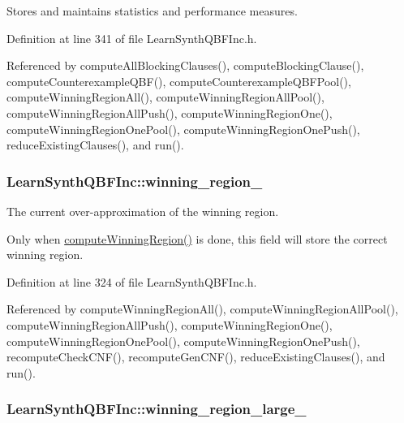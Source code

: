 Stores and maintains statistics and performance measures. 



Definition at line 341 of file Learn\-Synth\-Q\-B\-F\-Inc.\-h.



Referenced by compute\-All\-Blocking\-Clauses(), compute\-Blocking\-Clause(), compute\-Counterexample\-Q\-B\-F(), compute\-Counterexample\-Q\-B\-F\-Pool(), compute\-Winning\-Region\-All(), compute\-Winning\-Region\-All\-Pool(), compute\-Winning\-Region\-All\-Push(), compute\-Winning\-Region\-One(), compute\-Winning\-Region\-One\-Pool(), compute\-Winning\-Region\-One\-Push(), reduce\-Existing\-Clauses(), and run().

\hypertarget{classLearnSynthQBFInc_abc3503bdb6be7053a7c3d3d7e57858d6}{
\subsubsection[{winning\-\_\-region\-\_\-}]{ Learn\-Synth\-Q\-B\-F\-Inc\-::winning\-\_\-region\-\_\-\hspace{0.3cm}{\ttfamily [protected]}}}\label{classLearnSynthQBFInc_abc3503bdb6be7053a7c3d3d7e57858d6}


The current over-\/approximation of the winning region. 

Only when \hyperlink{classLearnSynthQBFInc_a2dc9fff9a414a40059a1d89e19b48252}{compute\-Winning\-Region()} is done, this field will store the correct winning region. 

Definition at line 324 of file Learn\-Synth\-Q\-B\-F\-Inc.\-h.



Referenced by compute\-Winning\-Region\-All(), compute\-Winning\-Region\-All\-Pool(), compute\-Winning\-Region\-All\-Push(), compute\-Winning\-Region\-One(), compute\-Winning\-Region\-One\-Pool(), compute\-Winning\-Region\-One\-Push(), recompute\-Check\-C\-N\-F(), recompute\-Gen\-C\-N\-F(), reduce\-Existing\-Clauses(), and run().

\hypertarget{classLearnSynthQBFInc_a5ef45d9d77b566fca1c5a1e6041f7c86}{
\subsubsection[{winning\-\_\-region\-\_\-large\-\_\-}]{ Learn\-Synth\-Q\-B\-F\-Inc\-::winning\-\_\-region\-\_\-large\-\_\-\hspace{0.3cm}{\ttfamily [protected]}}}\label{classLearnSynthQBFInc_a5ef45d9d77b566fca1c5a1e6041f7c86}


